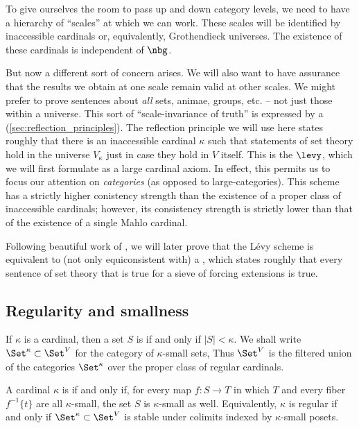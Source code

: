 To give ourselves the room to pass up and down category levels,
we need to have a hierarchy of \enquote{scales} at which we can work.
These scales will be identified by inaccessible cardinals
or, equivalently, Grothendieck universes.
The existence of these cardinals is independent of $ \nbg $.

But now a different sort of concern arises.
We will also want to have assurance
that the results we obtain at one scale remain valid at other scales.
We might prefer to prove sentences about
\emph{all} sets, animae, groups, etc. --
not just those within a universe.
This sort of \enquote{scale-invariance of truth}
is expressed by a  (\ref{sec:reflection_principles}).
The reflection principle we will use here states roughly that
there is an inaccessible cardinal $ \kappa $ such that
statements of set theory hold in the universe $ V_{\kappa} $
just in case they hold in $V$ itself.
This is the  $ \levy $,
which we will first formulate as a large cardinal axiom.
In effect, this permits us to focus our attention on \emph{categories}
(as opposed to large-categories).
This scheme has a strictly higher conistency strength
than the existence of a proper class of inaccessible cardinals;
however, its consistency strength is strictly lower
than that of the existence of a single Mahlo cardinal.

Following beautiful work of \cite{Hamkins2003},
we will later prove that the Lévy scheme is equivalent to
(not only equiconsistent with)
a ,
which states roughly that every sentence of set theory
that is true for a sieve of forcing extensions is true.

\subsection{Regularity and smallness}%
\label{sub:regularity_and_smallness}

\begin{definition}
	If $ \kappa $ is a cardinal,
	then a set $ S $ is 
	if and only if $ |S| < \kappa $.
	We shall write $ \Set^{\kappa} \subset \Set^V$
	for the category of $ \kappa $-small sets,
	Thus $ \Set^V $ is the filtered union of the categories $ \Set^{\kappa} $
	over the proper class of regular cardinals.
	
	A cardinal $ \kappa $ is 
	if and only if, for every map $ f \colon S \to T $
	in which $ T $ and every fiber $ f^{-1}\{t\} $ are all $ \kappa $-small,
	the set $ S $ is $ \kappa $-small as well.
	Equivalently, $ \kappa $ is regular if and only if
	$ \Set^{\kappa} \subset \Set^V $ is stable under colimits indexed by $ \kappa $-small posets.
\end{definition}

